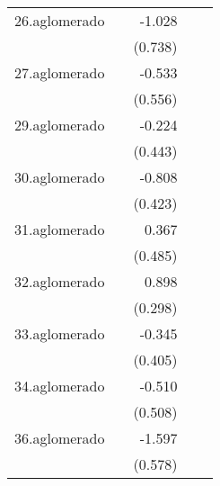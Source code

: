 {\begin{longtable}{l*{4}{D{.}{.}{-1}}}
\addlinespace
26.aglomerado&                     &      -1.028         &                     &                     \\
            &                     &     (0.738)         &                     &                     \\
\addlinespace
27.aglomerado&                     &      -0.533         &                     &                     \\
            &                     &     (0.556)         &                     &                     \\
\addlinespace
29.aglomerado&                     &      -0.224         &                     &                     \\
            &                     &     (0.443)         &                     &                     \\
\addlinespace
30.aglomerado&                     &      -0.808         &                     &                     \\
            &                     &     (0.423)         &                     &                     \\
\addlinespace
31.aglomerado&                     &       0.367         &                     &                     \\
            &                     &     (0.485)         &                     &                     \\
\addlinespace
32.aglomerado&                     &       0.898\sym{**} &                     &                     \\
            &                     &     (0.298)         &                     &                     \\
\addlinespace
33.aglomerado&                     &      -0.345         &                     &                     \\
            &                     &     (0.405)         &                     &                     \\
\addlinespace
34.aglomerado&                     &      -0.510         &                     &                     \\
            &                     &     (0.508)         &                     &                     \\
\addlinespace
36.aglomerado&                     &      -1.597\sym{**} &                     &                     \\
            &                     &     (0.578)         &                     &                     \\

\end{longtable}}
